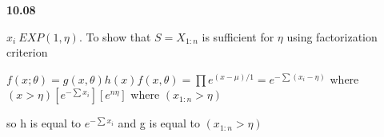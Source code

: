 
{ \bf 10.08 }

$x_{i} ~ EXP(1,\eta)$. To show that $S= X_{1:n}$ is sufficient for $\eta$ using factorization criterion 

$f(x;\theta) = g(x,\theta)h(x)

f(x,\theta) = \prod e^{(x-\mu)/1} = e^{-\sum(x_{i} - \eta)}$   where $(x> \eta)

 [e^{-\sum x_{i}}] [e^{n\eta}]$ where $(x_{1:n} > \eta)$

 so h is equal to $e^{-\sum x_{i}}$ and g is equal to $(x_{1:n} > \eta)  $ 
